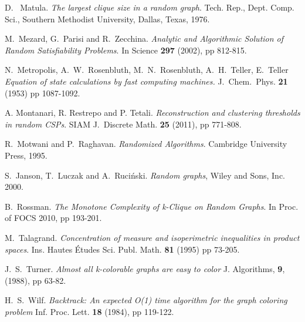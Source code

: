 \documentclass[a4paper,10pt]{article}
\begin{document}
\begin{thebibliography}{00}
 D.~ Matula. 
{\em The largest clique size in a random graph}.
Tech. Rep., Dept. Comp. Sci., Southern Methodist University, Dallas, Texas, 1976.


 M.~Mezard, G.~Parisi and R.~Zecchina. {\em Analytic and Algorithmic 
Solution of Random Satisfiability Problems}. In Science \textbf{297} (2002), pp 812-815.


N.~Metropolis, A.~W.~Rosenbluth, M.~N.~Rosenbluth,  A.~H.~Teller, E.~Teller
{\em Equation of state calculations by fast computing machines.}
J.~Chem.~Phys. \textbf{21} (1953) pp 1087-1092.



 A. Montanari, R. Restrepo and P. Tetali. {\em Reconstruction and
clustering thresholds in random CSPs}. SIAM J.\ Discrete Math.
{\bf 25} (2011), pp 771-808.



 R.~Motwani and P.~Raghavan. {\em Randomized Algorithms}.
Cambridge University Press, 1995.



S.~Janson, T.~Luczak and A.~Ruci\'nski. 
{\em Random graphs},
Wiley and Sons, Inc. 2000.



 B.~Rossman. {\em The Monotone Complexity of k-Clique 
on Random Graphs}. In Proc. of FOCS 2010, pp 193-201. 



 M.~Talagrand.
{\em Concentration of measure and isoperimetric inequalities in product spaces}.
Ins. Hautes \' Etudes Sci. Publ. Math. \textbf{81} 
(1995) pp 73-205.



 J.~S.~Turner. {\em Almost all k-colorable graphs are easy to color}
J. Algorithms, \textbf{9}, (1988), pp 63-82.

H.~S.~Wilf.
{\em Backtrack: An expected O(1) time algorithm for the graph coloring problem}
Inf. Proc. Lett. {\bf 18} (1984), pp 119-122.

\end{thebibliography}
\end{document}
